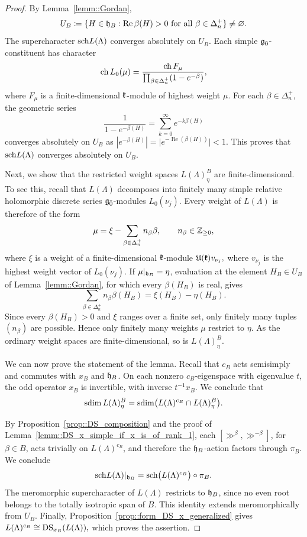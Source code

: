 \begin{proof} By Lemma~\ref{lemm::Gordan}, 
\[
U_B\coloneqq
\{H\in{\mathfrak h}_B:\operatorname{Re}\beta(H)>0
\text{ for all }\beta\in\Delta_n^+\}\neq \varnothing.
\]
The supercharacter ${\operatorname{sch}} L(\Lambda)$ converges absolutely on $U_B$. Each simple ${\mathfrak{g}_{\bar{0}}}$-constituent has character
\[
\operatorname{ch} L_0(\mu)
=
\frac{\operatorname{ch}F_\mu}
{\prod_{\beta\in\Delta_n^+}(1-e^{-\beta})},
\] where $F_{\mu}$ is a finite-dimensional ${\mathfrak k}$-module of highest weight $\mu$. For each $\beta \in \Delta_{n}^{+}$, the geometric series \[
\frac{1}{1-e^{-\beta(H)}}
=\sum_{k=0}^{\infty}e^{-k\beta(H)}
\] 
converges absolutely on $U_{B}$ as $|e^{-\beta(H)}|=\vert e^{-\operatorname{Re}(\beta(H))}\vert<1$. This proves that ${\operatorname{sch}} L(\Lambda)$ converges absolutely on $U_{B}$.

Next, we show that the restricted weight spaces
$
L(\Lambda)_{\eta}^{B}$
are finite-dimensional. To see this, recall that $L(\Lambda)$ decomposes into finitely many simple relative holomorphic discrete series ${\mathfrak{g}_{\bar{0}}}$-modules $L_0(\nu_j)$. Every weight of $L(\Lambda)$ is therefore of the form
\[
\mu=\xi-\sum_{\beta\in\Delta_n^+}n_\beta\beta,
\qquad n_\beta\in{\mathbb Z}_{\geq0},
\]
where $\xi$ is a weight of a finite-dimensional ${\mathfrak k}$-module ${\mathfrak U}({\mathfrak k})v_{\nu_j},
$
where $v_{\nu_{j}}$ is the highest weight vector of $L_{0}(\nu_{j})$. If $\mu|_{{\mathfrak h}_B}=\eta$, evaluation at the element $H_B\in U_{B}$ of Lemma~\ref{lemm::Gordan}, for which every $\beta(H_B)$ is real, gives
\[
\sum_{\beta\in\Delta_n^+}n_\beta\beta(H_B)
=
\xi(H_B)-\eta(H_B).
\]
Since every $\beta(H_B)>0$ and $\xi$ ranges over a finite set, only finitely many tuples $(n_\beta)$ are possible. Hence only finitely many weights $\mu$ restrict to $\eta$. As the ordinary weight spaces are finite-dimensional, so is $L(\Lambda)_{\eta}^{B}$.

We can now prove the statement of the lemma. Recall that $c_B$ acts semisimply and commutes with $x_B$ and ${\mathfrak h}_B$. On each nonzero $c_B$-eigenspace with eigenvalue $t$, the odd operator $x_B$ is invertible, with inverse $t^{-1}x_B$. We conclude that
\[
\operatorname{sdim} L(\Lambda)_{\eta}^{B}
=
\operatorname{sdim}\bigl(L(\Lambda)^{c_B}\cap L(\Lambda)_{\eta}^{B}\bigr).
\]

By Proposition~\ref{prop::DS_composition} and the proof of Lemma~\ref{lemm::DS_x_simple_if_x_is_of_rank_1}, each $[\gg^\beta,\gg^{-\beta}]$, for $\beta\in B$, acts trivially on $L(\Lambda)^{c_B}$, and therefore the ${\mathfrak h}_B$-action factors through $\pi_B$. We conclude
\[
{\operatorname{sch}} L(\Lambda)|_{{\mathfrak h}_B}
=
{\operatorname{sch}}\bigl(L(\Lambda)^{c_B}\bigr)\circ\pi_B.
\]
The meromorphic supercharacter of $L(\Lambda)$ restricts to ${\mathfrak h}_B$, since no even root belongs to the totally isotropic span of $B$. This identity extends meromorphically from $U_B$. Finally, Proposition~\ref{prop::form_DS_x_generalized} gives
$
L(\Lambda)^{c_B}\cong\operatorname{DS}_{x_B}(L(\Lambda)),
$
which proves the assertion.
\end{proof}

